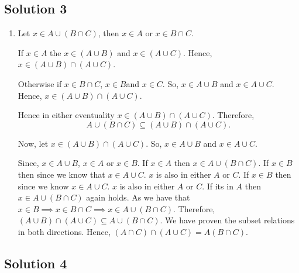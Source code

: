 \subsection{Solution 3}
\begin{enumerate}
  \item Let \( x \in A \cup \left( B \cap C \right) \), then \( x \in A \)
    or \( x \in  B \cap C \).

    If \( x \in A \) the \( x \in  \left( A \cup B \right) \) and \( x \in \left( A\cup C \right) \). 
    Hence, \( x \in  \left( A \cup B \right) \cap \left( A \cup C \right) \).

    Otherwise if \( x \in  B \cap C \), \( x \in  B \)and \( x \in  C \). So, \( x \in  A \cup B \)
    and \( x \in  A \cup C \). Hence, \( x \in  \left( A \cup B \right) \cap \left( A \cup C \right) \).

    Hence in either eventuality \( x \in  \left( A \cup B \right) \cap  \left( A \cup C \right) \). Therefore, 
    \[
     A \cup \left( B \cap C \right) \subseteq \left( A \cup B \right) \cap  \left( A \cup  C \right)
    .\] 

    Now, let \( x \in  \left( A \cup B \right) \cap \left( A \cup C \right) \). So, \( x \in  A \cup B \) and  
    \(x \in  A \cup  C \).

    Since, \( x \in  A \cup B \), \( x \in A \) or \( x \in  B \). If
    \( x \in  A \) then \( x \in  A \cup \left( B \cap C \right). \)
    If \( x \in  B \) then since we know that \( x \in  A \cup C \). \( x \) is also in either \( A \) or \( C \).
    If \( x \in  B \) then since we know \( x \in  A \cup C \). \( x  \) is also in either \( A  \) or \( C \).
    If its in \( A \) then \( x \in  A \cup \left( B \cap C \right) \) again holds. As we have that \( x \in  B \implies  x \in  B \cap C \implies x \in  A \cup \left( B \cap C \right)\).
    Therefore, \( \left( A \cup B \right) \cap  \left(  A \cup C \right) \subseteq A \cup  \left( B \cap C \right) \).
    We have proven the subset relations in both directions. Hence, \( \left( A \cap  C \right) \cap  \left( A \cup C \right) = A \left( B \cap C \right) \).
\end{enumerate}

\subsection{Solution 4}

